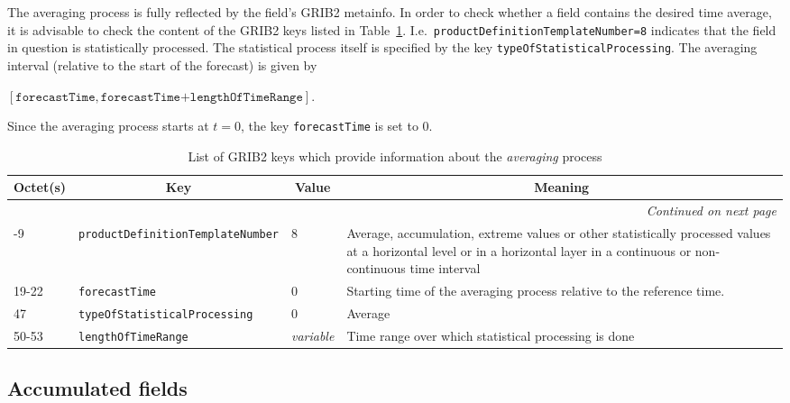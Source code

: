 The averaging process is fully reflected by the field's GRIB2 metainfo. In order to check whether a field contains the desired time average, it is 
advisable to check the content of the GRIB2 keys listed in Table~\ref{tab_GRIB2avg}.
I.e.\ \texttt{productDefinitionTemplateNumber=8} indicates that the field in question is statistically processed. The statistical process itself 
is specified by the key \texttt{typeOfStatisticalProcessing}. The averaging interval (relative to the start of the forecast) is given by 
\begin{center}
$[\texttt{forecastTime}, \texttt{forecastTime+lengthOfTimeRange}]$. 
\end{center}
Since the averaging process starts at $t=0$, the key \texttt{forecastTime} 
is set to 0. 

\begin{longtable}{p{1.2cm}p{5.5cm}p{1.0cm}p{6.0cm}}
\caption[]{List of GRIB2 keys which provide information about the \emph{averaging} process}\label{tab_GRIB2avg}\\
  \toprule
\multicolumn{1}{c}{\textbf{Octet(s)}}  &  \multicolumn{1}{c}{\textbf{Key}}  & \multicolumn{1}{c}{\textbf{Value}} & \multicolumn{1}{c}{\textbf{Meaning}} \\
\midrule
\endhead
\hline \multicolumn{4}{r}{\textit{Continued on next page}} \\
\endfoot
\endlastfoot
 8-9        &  \texttt{productDefinitionTemplateNumber}             &     8               &    Average, accumulation, extreme values or other statistically processed values at a horizontal level or in a horizontal layer in a continuous or non-continuous time interval   \\
 19-22      &  \texttt{forecastTime}                                &     0               &    Starting time of the averaging process relative to the reference time. \\
 47         &  \texttt{typeOfStatisticalProcessing}                 &     0               &    Average                                  \\
 50-53      &  \texttt{lengthOfTimeRange}                           &    \emph{variable}  &    Time range over which statistical processing is done \\
\bottomrule
\end{longtable}


\subsection{Accumulated fields}

